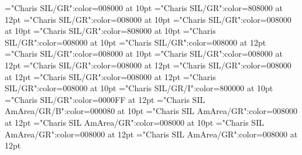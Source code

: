 \documentclass[a4paper,twoside]{article}
\begin{document}
\font\spandefinitionorglossmainentrysubsensesensesensecontentmainentrysubsensessensessensesensecontentsensesentryletDatadicBody="Charis SIL/GR":color=008000 at 10pt
\font\restrictionsmainentrysubsensesensesensecontentmainentrysubsensessensessensesensecontentsensesentryletDatadicBody="Charis SIL/GR":color=808000 at 12pt
\font\spanesrestrictionsmainentrysubsensesensesensecontentmainentrysubsensessensessensesensecontentsensesentryletDatadicBody="Charis SIL/GR":color=008000 at 10pt
\font\spanspanesrestrictionsmainentrysubsensesensesensecontentmainentrysubsensessensessensesensecontentsensesentryletDatadicBody="Charis SIL/GR":color=008000 at 10pt
\font\spanrestrictionsmainentrysubsensesensesensecontentmainentrysubsensessensessensesensecontentsensesentryletDatadicBody="Charis SIL/GR":color=808000 at 10pt
\font\spansensecontentmainentrysubsensessensessensesensecontentsensesentryletDatadicBody="Charis SIL/GR":color=008000 at 10pt
\font\variantformentrybackrefsentryletDatadicBody="Charis SIL/GR":color=008000 at 12pt
\font\spanvariantformentrybackrefsentryletDatadicBody="Charis SIL/GR":color=008000 at 10pt
\font\variantformentrybackrefvariantformentrybackrefsentryletDatadicBody="Charis SIL/GR":color=008000 at 12pt
\font\variantentrytypesvariantformentrybackrefvariantformentrybackrefsentryletDatadicBody="Charis SIL/GR":color=008000 at 12pt
\font\variantentrytypevariantentrytypesvariantformentrybackrefvariantformentrybackrefsentryletDatadicBody="Charis SIL/GR":color=008000 at 12pt
\font\abbreviationvariantentrytypevariantentrytypesvariantformentrybackrefvariantformentrybackrefsentryletDatadicBody="Charis SIL/GR":color=008000 at 12pt
\font\spanesabbreviationvariantentrytypevariantentrytypesvariantformentrybackrefvariantformentrybackrefsentryletDatadicBody="Charis SIL/GR":color=008000 at 10pt
\font\spanabbreviationvariantentrytypevariantentrytypesvariantformentrybackrefvariantformentrybackrefsentryletDatadicBody="Charis SIL/GR/I":color=800000 at 10pt
\font\headwordvariantformentrybackrefvariantformentrybackrefsentryletDatadicBody="Charis SIL/GR":color=0000FF at 12pt
\font\spanmxbheadwordvariantformentrybackrefvariantformentrybackrefsentryletDatadicBody="Charis SIL AmArea/GR/B":color=000080 at 10pt
\font\variantformentrybackrefsbentryletDatadicBody="Charis SIL AmArea/GR":color=008000 at 12pt
\font\spanvariantformentrybackrefsbentryletDatadicBody="Charis SIL AmArea/GR":color=008000 at 10pt
\font\variantformentrybackrefbvariantformentrybackrefsbentryletDatadicBody="Charis SIL AmArea/GR":color=008000 at 12pt
\font\variantentrytypesvariantformentrybackrefbvariantformentrybackrefsbentryletDatadicBody="Charis SIL AmArea/GR":color=008000 at 12pt
\end{document}
